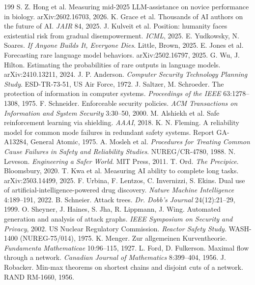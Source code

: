 \documentclass[10pt,twocolumn]{article}
\theoremstyle{plain}
\theoremstyle{definition}
\begin{document}
\begin{thebibliography}{199}
 S. Z. Hong et al. Measuring mid-2025 LLM-assistance on novice performance in biology. arXiv:2602.16703, 2026.
 K. Grace et al. Thousands of AI authors on the future of AI. \emph{JAIR} 84, 2025.
 J. Kulveit et al. Position: humanity faces existential risk from gradual disempowerment. \emph{ICML}, 2025.
 E. Yudkowsky, N. Soares. \emph{If Anyone Builds It, Everyone Dies}. Little, Brown, 2025.
 E. Jones et al. Forecasting rare language model behaviors. arXiv:2502.16797, 2025.
 G. Wu, J. Hilton. Estimating the probabilities of rare outputs in language models. arXiv:2410.13211, 2024.
 J. P. Anderson. \emph{Computer Security Technology Planning Study}. ESD-TR-73-51, US Air Force, 1972.
 J. Saltzer, M. Schroeder. The protection of information in computer systems. \emph{Proceedings of the IEEE} 63:1278--1308, 1975.
 F. Schneider. Enforceable security policies. \emph{ACM Transactions on Information and System Security} 3:30--50, 2000.
 M. Alshiekh et al. Safe reinforcement learning via shielding. \emph{AAAI}, 2018.
 K. N. Fleming. A reliability model for common mode failures in redundant safety systems. Report GA-A13284, General Atomic, 1975.
 A. Mosleh et al. \emph{Procedures for Treating Common Cause Failures in Safety and Reliability Studies}. NUREG/CR-4780, 1988.
 N. Leveson. \emph{Engineering a Safer World}. MIT Press, 2011.
 T. Ord. \emph{The Precipice}. Bloomsbury, 2020.
 T. Kwa et al. Measuring AI ability to complete long tasks. arXiv:2503.14499, 2025.
 F. Urbina, F. Lentzos, C. Invernizzi, S. Ekins. Dual use of artificial-intelligence-powered drug discovery. \emph{Nature Machine Intelligence} 4:189--191, 2022.
 B. Schneier. Attack trees. \emph{Dr. Dobb's Journal} 24(12):21--29, 1999.
 O. Sheyner, J. Haines, S. Jha, R. Lippmann, J. Wing. Automated generation and analysis of attack graphs. \emph{IEEE Symposium on Security and Privacy}, 2002.
 US Nuclear Regulatory Commission. \emph{Reactor Safety Study}. WASH-1400 (NUREG-75/014), 1975.
 K. Menger. Zur allgemeinen Kurventheorie. \emph{Fundamenta Mathematicae} 10:96--115, 1927.
 L. Ford, D. Fulkerson. Maximal flow through a network. \emph{Canadian Journal of Mathematics} 8:399--404, 1956.
 J. Robacker. Min-max theorems on shortest chains and disjoint cuts of a network. RAND RM-1660, 1956.

\end{thebibliography}
\end{document}
